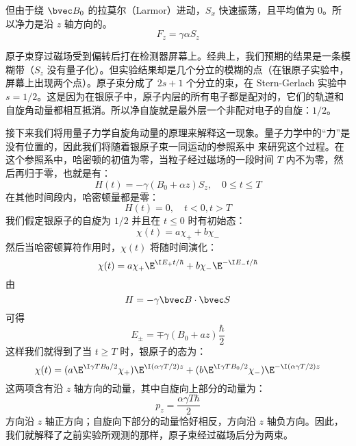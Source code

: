 但由于绕 $\bvec B_0$ 的拉莫尔（Larmor）进动，$S_x$ 快速振荡，且平均值为 $0$。所以净力是沿 $z$ 轴方向的。
\begin{equation}
F_z=\gamma\alpha S_z
\end{equation}

原子束穿过磁场受到偏转后打在检测器屏幕上。经典上，我们预期的结果是一条模糊带（$S_z$ 没有量子化）。但实验结果却是几个分立的模糊的点（在银原子实验中，屏幕上出现两个点）。原子束分成了 $2s+1$ 个分立的束，在 Stern-Gerlach 实验中 $s=1/2$。这是因为在银原子中，原子内层的所有电子都是配对的，它们的轨道和自旋角动量都相互抵消。所以净自旋就是最外层一个非配对电子的自旋：$1/2$。

接下来我们将用量子力学自旋角动量的原理来解释这一现象。量子力学中的“力”是没有位置的，因此我们将随着银原子束一同运动的参照系中
来研究这个过程。在这个参照系中，哈密顿的初值为零，当粒子经过磁场的一段时间 $T$ 内不为零，然后再归于零，也就是有：
\begin{equation}
H(t)=-\gamma(B_0+\alpha z)S_z, \quad 0\leq t\leq T
\end{equation}
在其他时间段内，哈密顿量都是零：
\begin{equation}
H(t)=0, \quad t<0,t>T
\end{equation}
我们假定银原子的自旋为 $1/2$ 并且在 $t\leq 0$ 时有初始态：
\begin{equation}
\chi(t)=a\chi_++b\chi_-
\end{equation}
然后当哈密顿算符作用时，$\chi(t)$ 将随时间演化：
\begin{equation}
\chi(t)=a\chi_+\E^{\I E_+ t/\hbar} + b\chi_-\E^{-\I E_- t/\hbar}
\end{equation}
由
\begin{equation}
H=-\gamma\bvec B\cdot \bvec S
\end{equation}
可得
\begin{equation}
E_\pm = \mp \gamma(B_0+az)\frac{\hbar}{2}
\end{equation}
这样我们就得到了当 $t\geq T$ 时，银原子的态为：
\begin{equation}
\chi(t)=(a\E^{\I\gamma TB_0/2}\chi_+)\E^{\I(\alpha\gamma T/2)z} + (b\E^{\I\gamma TB_0/2}\chi_-)\E^{-\I(\alpha\gamma T/2)z} 
\end{equation}
这两项含有沿 $ z $ 轴方向的动量，其中自旋向上部分的动量为：
\begin{equation}
p_z=\frac{\alpha\gamma T\hbar}{2}
\end{equation}
方向沿 $ z $ 轴正方向；自旋向下部分的动量恰好相反，方向沿 $ z $ 轴负方向。因此，我们就解释了之前实验所观测的那样，原子束经过磁场后分为两束。

